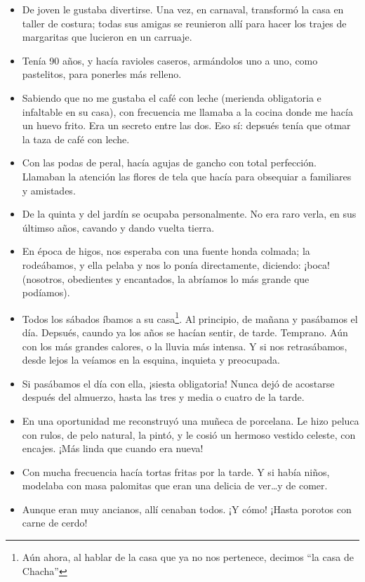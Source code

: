 \documentclass{article}
\begin{document}
\begin{itemize}
    \item{De joven le gustaba divertirse. Una vez, en carnaval, transformó la casa en taller de costura; todas sus amigas se reunieron allí para hacer los trajes de margaritas que lucieron en un carruaje.}
    \item{Tenía 90 años, y hacía ravioles caseros, armándolos uno a uno, como pastelitos, para ponerles más relleno.}
    \item{Sabiendo que no me gustaba el café con leche (merienda obligatoria e infaltable en su casa), con frecuencia me llamaba a la cocina donde me hacía un huevo frito. Era un secreto entre las dos. Eso sí: depsués tenía que otmar la taza de café con leche.}
    \item{Con las podas de peral, hacía agujas de gancho con total perfección. Llamaban la atención las flores de tela que hacía para obsequiar a familiares y amistades.}
    \item{De la quinta y del jardín se ocupaba personalmente. No era raro verla, en sus últimso años, cavando y dando vuelta tierra.}
    \item{En época de higos, nos esperaba con una fuente honda colmada; la rodeábamos, y ella pelaba y nos lo ponía directamente, diciendo: ¡boca! (nosotros, obedientes y encantados, la abríamos lo más grande que podíamos).}
    \item{Todos los sábados íbamos a su casa\footnote{Aún ahora, al hablar de la casa que ya no nos pertenece, decimos ``la casa de Chacha''}. Al principio, de mañana y pasábamos el día. Depsués, caundo ya los años se hacían sentir, de tarde. Temprano. Aún con los más grandes calores, o la lluvia más intensa. Y si nos retrasábamos, desde lejos la veíamos en la esquina, inquieta y preocupada.}
    \item{Si pasábamos el día con ella, ¡siesta obligatoria! Nunca dejó de acostarse después del almuerzo, hasta las tres y media o cuatro de la tarde.}
    \item{En una oportunidad me reconstruyó una muñeca de porcelana. Le hizo peluca con rulos, de pelo natural, la pintó, y le cosió un hermoso vestido celeste, con encajes. ¡Más linda que cuando era nueva!}
    \item{Con mucha frecuencia hacía tortas fritas por la tarde. Y si había niños, modelaba con masa palomitas que eran una delicia de ver\ldots y de comer.}
    \item{Aunque eran muy ancianos, allí cenaban todos. ¡Y cómo! ¡Hasta porotos con carne de cerdo!}
\end{itemize}
\end{document}
